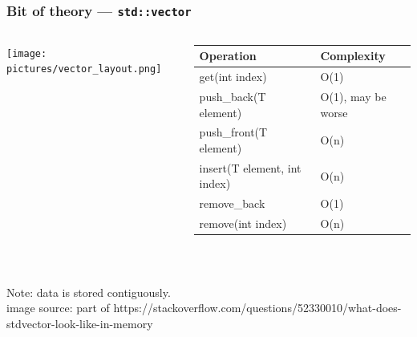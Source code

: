 \documentclass[aspectratio=169]{beamer}
\newcommand{\cpp}[1]{\texttt{\textbf{\textcolor{clCodeBlue}{#1}}}}
\newcommand\fontV{\fontsize{5}{5}\selectfont}
\newcommand\addsource[1]{\fontV\textcolor{clGray}{#1}}
\begin{document}
\begin{frame}
\frametitle{Bit of theory --- \cpp{std::vector}}
\begin{columns}
  \begin{column}{0.38\textwidth}
    \texttt{[image: pictures/vector\_layout.png]} \\
  \end{column}\hfill%
  \begin{column}{0.58\textwidth}
    \begin{tabular}{|l|l|}
      \hline
      Operation & Complexity \\
      \hline\hline
      get(int index) & O(1) \\
      \hline
      push\_back(T element) & O(1), may be worse \\
      push\_front(T element) & \textcolor{clRedFlag}{O(n)} \\
      \hline
      insert(T element, int index) & \textcolor{clRedFlag}{O(n)} \\
      \hline
      remove\_back & O(1) \\
      remove(int index) & \textcolor{clRedFlag}{O(n)} \\
      \hline
    \end{tabular} \\
  \end{column}
\end{columns}
\vspace*{24pt}
{\centering Note: data is \textcolor{clGreenFlag}{stored contiguously}.\\}
\vspace*{12pt}
\addsource{image source: part of https://stackoverflow.com/questions/52330010/what-does-stdvector-look-like-in-memory}
\end{frame}
\end{document}
